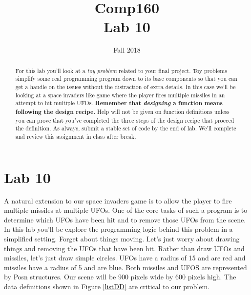 \documentclass[nobib]{tufte-handout}
\title{Comp160 \\ Lab 10 }
\author{}
\date{ Fall 2018 }
\begin{document}
\maketitle

\begin{abstract}
For this lab you'll look at a \textit{toy problem} related to your final project. Toy problems simplify some real programming program down to its base components so that you can get a handle on the issues without the distraction of extra details. In this case we'll be looking at a space invaders like game where the player fires multiple missiles in an attempt to hit multiple UFOs. \textbf{Remember that \textit{designing} a function means following the design recipe.} Help will not be given on function definitions unless you can prove that you've completed the three steps of the design recipe that proceed the definition. As always, submit a stable set of code by the end of lab. We'll complete and review this assignment in class after break. 
\end{abstract}

\section*{Lab 10}

A natural extension to our space invaders game is to allow the player to fire multiple missiles at multiple UFOs. One of the core tasks of such a program is to determine which UFOs have been hit and to remove those UFOs from the scene. In this lab you'll be explore the programming logic behind this problem in a simplified setting. Forget about things moving. Let's just worry about drawing things and removing the UFOs that have been hit. Rather than draw UFOs and missiles, let's just draw simple circles. UFOs have a radius of 15 and are red and missiles have a radius of 5 and are blue. Both missiles and UFOS are represented by Posn structures. Our scene will be 900 pixels wide by 600 pixels high.  The data definitions shown in Figure \ref{listDD} are critical to our problem.
\end{document}
